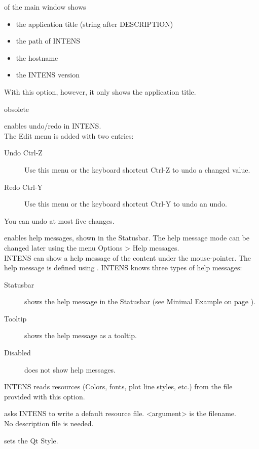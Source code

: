 \begin{description}
  of the main window shows
  \begin{itemize}
  \item the application title (string after DESCRIPTION)
  \item the path of INTENS
  \item the hostname
  \item the INTENS version
  \end{itemize}
  With this option, however, it only shows the application title.
%
\item[\texttt{--}toolbar]
  obsolete
%
\item[\texttt{--}undo] enables undo/redo in INTENS. \\
  The Edit menu is added with two entries:
  \begin{description}
  \item[Undo Ctrl-Z] Use this menu or the keyboard shortcut Ctrl-Z to undo a changed value.
  \item[Redo Ctrl-Y] Use this menu or the keyboard shortcut Ctrl-Y to undo an undo.
  \end{description}
  You can undo at most five changes.
%
\item[\texttt{--}helpmsg] enables help messages, shown in the Statusbar.
  The help message mode can be changed later using the menu Options > Help messages. \\
  INTENS can show a help message of the content under the mouse-pointer. The help message is defined
  using \HELPTEXT.
  INTENS knows three types of help messages:
  \begin{description}
  \item[Statusbar] shows the help message in the Statusbar
  (see Minimal Example on page \pageref{fig:minimalExample}).
  \item[Tooltip] shows the help message as a tooltip.
  \item[Disabled] does not show help messages.
  \end{description}
%
\item[\texttt{--}resfile <argument>]
  INTENS reads resources (Colors, fonts, plot line styles, etc.) from the file
  provided with this option.
%
\item[\texttt{--}createRes <argument>] asks INTENS to write a default resource file.
  <argument> is the filename. \\
  No description file is needed.
%
\item[\texttt{--}qtGuiStyle <argument>] sets the Qt Style. \\

\end{description}
